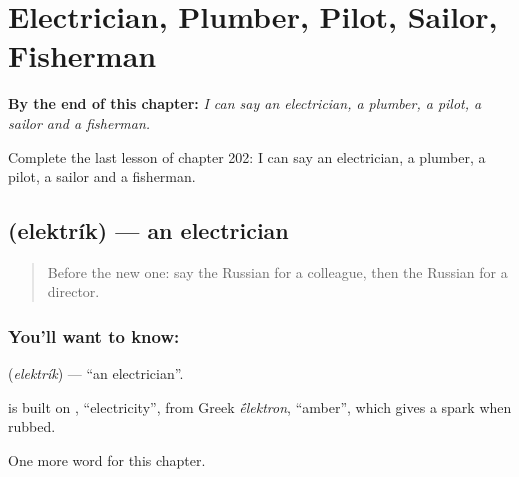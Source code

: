 
\chapter{Electrician, Plumber, Pilot, Sailor, Fisherman}
\label{ch:ru-electrician-plumber-pilot-sailor-fisherman}

\begin{chapteropening}
\textbf{By the end of this chapter:} \emph{I can say an electrician, a plumber, a pilot, a sailor and a fisherman.}

Complete the last lesson of chapter 202: I can say an electrician, a plumber, a pilot, a sailor and a fisherman.
\end{chapteropening}

\section[\texorpdfstring{\ru{электрик} (elektrík)}{электрик (elektrík)}]{ (elektrík) — an electrician}

\label{lesson:RU-C202-elektrik}



\begin{quote}
Before the new one: say the Russian for a colleague, then the Russian for a director.
\end{quote}

\subsection*{You'll want to know: }
\textbf{} (\emph{elektrík}) — \textquotedblleft{}an electrician\textquotedblright{}.

\begin{cousinweb}
\textbf{} is built on \emph{}, \textquotedblleft{}electricity\textquotedblright{}, from Greek \emph{\'{\={e}}lektron}, \textquotedblleft{}amber\textquotedblright{}, which gives a spark when rubbed.
\end{cousinweb}

\begin{grammarlens}[title={What you've built}]
One more word for this chapter.
\end{grammarlens}

